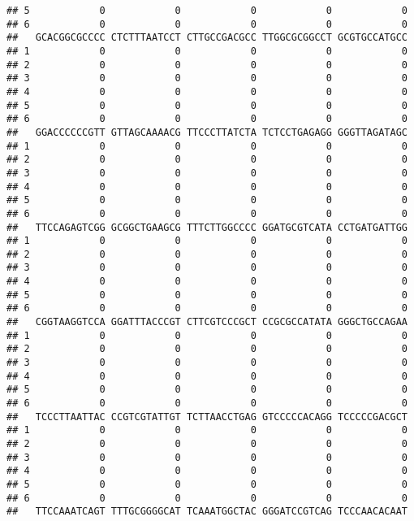 \documentclass[]{article}
\begin{document}
\begin{verbatim}
## 5            0            0            0            0            0
## 6            0            0            0            0            0
##   GCACGGCGCCCC CTCTTTAATCCT CTTGCCGACGCC TTGGCGCGGCCT GCGTGCCATGCC
## 1            0            0            0            0            0
## 2            0            0            0            0            0
## 3            0            0            0            0            0
## 4            0            0            0            0            0
## 5            0            0            0            0            0
## 6            0            0            0            0            0
##   GGACCCCCCGTT GTTAGCAAAACG TTCCCTTATCTA TCTCCTGAGAGG GGGTTAGATAGC
## 1            0            0            0            0            0
## 2            0            0            0            0            0
## 3            0            0            0            0            0
## 4            0            0            0            0            0
## 5            0            0            0            0            0
## 6            0            0            0            0            0
##   TTCCAGAGTCGG GCGGCTGAAGCG TTTCTTGGCCCC GGATGCGTCATA CCTGATGATTGG
## 1            0            0            0            0            0
## 2            0            0            0            0            0
## 3            0            0            0            0            0
## 4            0            0            0            0            0
## 5            0            0            0            0            0
## 6            0            0            0            0            0
##   CGGTAAGGTCCA GGATTTACCCGT CTTCGTCCCGCT CCGCGCCATATA GGGCTGCCAGAA
## 1            0            0            0            0            0
## 2            0            0            0            0            0
## 3            0            0            0            0            0
## 4            0            0            0            0            0
## 5            0            0            0            0            0
## 6            0            0            0            0            0
##   TCCCTTAATTAC CCGTCGTATTGT TCTTAACCTGAG GTCCCCCACAGG TCCCCCGACGCT
## 1            0            0            0            0            0
## 2            0            0            0            0            0
## 3            0            0            0            0            0
## 4            0            0            0            0            0
## 5            0            0            0            0            0
## 6            0            0            0            0            0
##   TTCCAAATCAGT TTTGCGGGGCAT TCAAATGGCTAC GGGATCCGTCAG TCCCAACACAAT

\end{verbatim}
\end{document}
